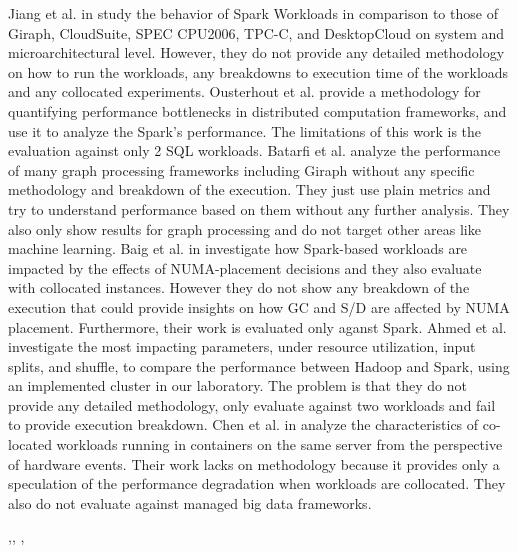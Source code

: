 Jiang et al. in \cite{inmem} study the behavior of Spark Workloads in comparison to those of Giraph, CloudSuite, SPEC CPU2006,
TPC-C, and DesktopCloud on system and microarchitectural level. However, they do not provide any detailed methodology on how to 
run the workloads, any breakdowns to execution time of the workloads and any collocated experiments. Ousterhout et al. \cite{makingsense} provide a methodology for quantifying performance bottlenecks in distributed computation frameworks, and use it to analyze the Spark’s performance. The limitations of this work is the evaluation against only 2 SQL workloads. Batarfi et al. \cite{giraphgraphalytics} analyze the performance of many graph processing frameworks including Giraph without any specific methodology and breakdown of the execution. They just use plain metrics and try to understand performance based on them without any further analysis. They also only show results for graph processing and do not target other areas like machine learning. Baig et al. in \cite{NUMA} investigate how Spark-based workloads are impacted by the effects of NUMA-placement decisions and they also evaluate with collocated instances. However they do not show any breakdown of the execution that could provide insights on how GC and S/D are affected by NUMA placement. Furthermore, their work is evaluated only aganst Spark. Ahmed et al. \cite{hibench} investigate the most impacting parameters, under resource utilization, input splits, and shuffle, to compare the performance between Hadoop and Spark, using an implemented cluster in our laboratory. The problem is that they do not provide any detailed methodology, only evaluate against two workloads and fail to provide execution breakdown. Chen et al. in \cite{interference} analyze the characteristics of co-located workloads running in containers on the same server from the perspective of hardware events. Their work lacks on methodology because it provides only a speculation of the performance degradation when workloads are collocated. They also do not evaluate against managed big data frameworks. 

\cite{CoLoc},\cite{SLA}, \cite{Hadoop-based}, \cite{splitserve}
